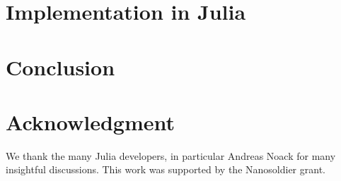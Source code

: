 \documentclass[conference]{IEEEtran}
\begin{document}
\label{sec:julia}
\section{Implementation in Julia}

\label{sec:conclusion}
\section{Conclusion}

\label{sec:acknowledgement}
\section*{Acknowledgment}

We thank the many Julia developers, in particular Andreas Noack for many insightful
discussions. This work was supported by the Nanosoldier grant.




\end{document}
